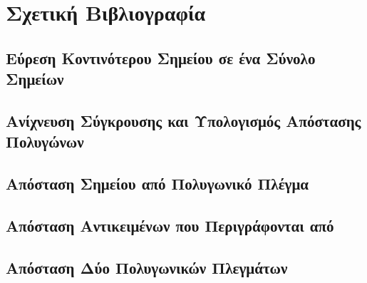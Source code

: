 \chapter{Σχετική Βιβλιογραφία}

\section{Εύρεση Κοντινότερου Σημείου σε ένα Σύνολο Σημείων}

\section{Ανίχνευση Σύγκρουσης και Υπολογισμός Απόστασης Πολυγώνων}

\section{Απόσταση Σημείου από Πολυγωνικό Πλέγμα}

\section{Απόσταση Αντικειμένων που Περιγράφονται από }

\section{Απόσταση Δύο Πολυγωνικών Πλεγμάτων}
